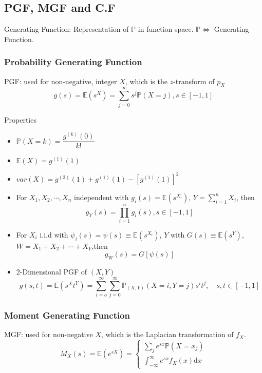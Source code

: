 \subsection{PGF, MGF and C.F}\label{SectionPGFMGFCF}

    Generating Function: Representation of $\mathbb{P}$ in function space. $\mathbb{P}\Leftrightarrow$ Generating Function.

\subsubsection{Probability Generating Function}
    PGF: used for non-negative, integer $X$, which is the $ z $-transform of $ p_X $
    \begin{equation}
        g(s)=\mathbb{E}(s^X)=\sum_{j=0}^\infty s^j\mathbb{P}(X=j)    ,s\in[-1,1]
    \end{equation}

\begin{point}
        Properties
\end{point}
    \begin{itemize}[topsep=2pt,itemsep=0pt]
        \item $\mathbb{P}(X=k)=\dfrac{g^{(k)}(0)}{k!}$
        \item $\mathbb{E}(X)=g^{(1)}(1)$
        \item $var(X)=g^{(2)}(1)+g^{(1)}(1)-[g^{(1)}(1)]^2 $
        \item For $X_1,X_2,\cdots,X_n$ independent with $g_i(s)=\mathbb{E}(s^{X_i})$, $Y={\displaystyle \sum_{i=1}^n} X_i$, then
        \begin{equation}    
            g_Y(s)=\prod_{i=1}^n g_i(s),s\in[-1,1]
        \end{equation}
        \item For ${X_i}$ i.i.d with $\psi_i(s)=\psi(s)\equiv \mathbb{E}(s^{X_i})$, $Y$ with $G(s)\equiv\mathbb{E}(s^{Y})$, $W=X_1+X_2+\cdots +X_Y$,then
        \begin{equation}    
            g_W(s)=G[\psi(s)]    
        \end{equation}
        \item 2-Dimensional PGF of $(X,Y)$
        \begin{equation}    
            g(s,t)=\mathbb{E}(s^Xt^Y)=\sum_{i=o}^\infty\sum_{j=0}^\infty \mathbb{P}_{(X,Y)}(X=i,Y=j)s^it^j,\quad s,t\in[-1,1]
        \end{equation}
    \end{itemize}
\subsubsection{Moment Generating Function}
    MGF: used for non-negative $ X $, which is the Laplacian transformation of $ f_X $.
    \begin{equation}
        M_X(s)=\mathbb{E}(e^{sX})=\begin{cases}
            \sum_je^{sx}\mathbb{P}(X=x_j)\\
            \int_{-\infty}^\infty e^{sx}f_X(x)\mathrm{d}x
        \end{cases}
    \end{equation}

